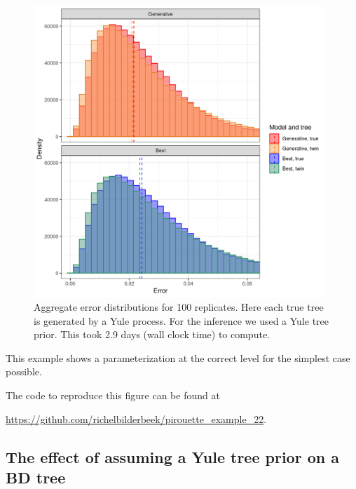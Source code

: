 \begin{figure}[H]
  \includegraphics[width=0.98\textwidth]{pirouette_example_22/errors.png}
  \caption{Aggregate error distributions for 100 replicates. 
    Here each true tree is generated by a Yule process. 
    For the inference we used a Yule tree prior. 
    This took 2.9 days (wall clock time) to compute.}
  \label{fig:example_yule}
\end{figure}

This example shows a parameterization at the correct level for the
simplest case possible.


The code to reproduce this figure can be found at  
\begin{sloppypar}
  \url{https://github.com/richelbilderbeek/pirouette_example_22}.
\end{sloppypar}

\newpage

\subsection{The effect of assuming a Yule tree prior on a BD tree}
\label{subsec:under_parameterization}

